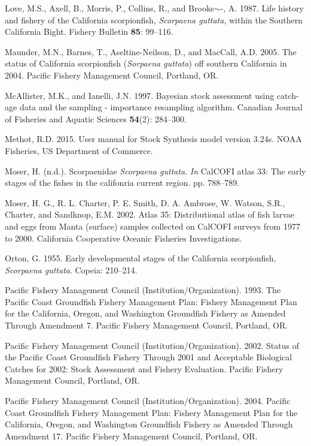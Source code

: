 \documentclass[12pt,]{article}
\begin{document}
\hypertarget{ref-Love1987}{}
Love, M.S., Axell, B., Morris, P., Collins, R., and Brooks\(\sim\)-, A.
1987. Life history and fishery of the California scorpionfish,
\emph{Scorpaena guttata}, within the Southern California Bight. Fishery
Bulletin \textbf{85}: 99--116.

\hypertarget{ref-Maunder2005}{}
Maunder, M.N., Barnes, T., Aseltine-Neilson, D., and MacCall, A.D. 2005.
The status of California scorpionfish (\emph{Sorpaena guttata}) off
southern California in 2004. Pacific Fishery Management Council,
Portland, OR.

\hypertarget{ref-McAllister1997}{}
McAllister, M.K., and Ianelli, J.N. 1997. Bayesian stock assessment
using catch-age data and the sampling - importance resampling algorithm.
Canadian Journal of Fisheries and Aquatic Sciences \textbf{54}(2):
284--300.

\hypertarget{ref-Methot2015}{}
Methot, R.D. 2015. User manual for Stock Synthesis model version 3.24s.
NOAA Fisheries, US Department of Commerce.

\hypertarget{ref-Moser1996}{}
Moser, H. (n.d.). Scorpaenidae \emph{Scorpaena guttata}. \emph{In}
CalCOFI atlas 33: The early stages of the fishes in the califonria
current region. pp. 788--789.

\hypertarget{ref-Moser2002}{}
Moser, H. G., R. L. Charter, P. E. Smith, D. A. Ambrose, W. Watson,
S.R., Charter, and Sandknop, E.M. 2002. Atlas 35: Distributional atlas
of fish larvae and eggs from Manta (surface) samples collected on
CalCOFI surveys from 1977 to 2000. California Cooperative Oceanic
Fisheries Investigations.

\hypertarget{ref-Orton1955}{}
Orton, G. 1955. Early developmental stages of the California
scorpionfish, \emph{Scorpaena guttata}. Copeia: 210--214.

\hypertarget{ref-PFMC1993}{}
Pacific Fishery Management Council (Institution/Organization). 1993. The
Pacific Coast Groundfish Fishery Management Plan: Fishery Management
Plan for the California, Oregon, and Washington Groundfish Fishery as
Amended Through Amendment 7. Pacific Fishery Management Council,
Portland, OR.

\hypertarget{ref-PFMC2002}{}
Pacific Fishery Management Council (Institution/Organization). 2002.
Status of the Pacific Coast Groundfish Fishery Through 2001 and
Acceptable Biological Catches for 2002: Stock Assessment and Fishery
Evaluation. Pacific Fishery Management Council, Portland, OR.

\hypertarget{ref-PFMC2004}{}
Pacific Fishery Management Council (Institution/Organization). 2004.
Pacific Coast Groundfish Fishery Management Plan: Fishery Management
Plan for the California, Oregon, and Washington Groundfish Fishery as
Amended Through Amendment 17. Pacific Fishery Management Council,
Portland, OR.
\end{document}

